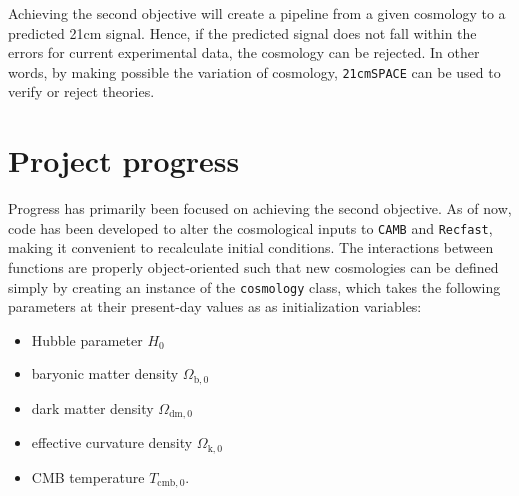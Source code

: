 \documentclass[floats,floatfix,showpacs,amssymb,prd,superscriptaddress,nofootinbib]{revtex4-2} %
\newcommand{\code}{\texttt}
\begin{document}
Achieving the second objective will create a pipeline from a given cosmology to a predicted 21cm signal. Hence, if the predicted signal does not fall within the errors for current experimental data, the cosmology can be rejected. In other words, by making possible the variation of cosmology, \code{21cmSPACE} can be used to verify or reject theories.

\section{Project progress}





Progress has primarily been focused on achieving the second objective. As of now, code has been developed to alter the cosmological inputs to \code{CAMB} and \code{Recfast}, making it convenient to recalculate initial conditions. The interactions between functions are properly object-oriented such that new cosmologies can be defined simply by creating an instance of the \code{cosmology} class, which takes the following parameters at their present-day values as  as initialization variables:

\begin{itemize}
    \item  Hubble parameter $H_0$

    \item baryonic matter density $\Omega_{\text{b},0}$

    \item dark matter density $\Omega_{\text{dm},0}$

    \item effective curvature density $\Omega_{\text{k},0}$

     \item CMB temperature $T_{\text{cmb}, 0}$.
\end{itemize}
\end{document}
